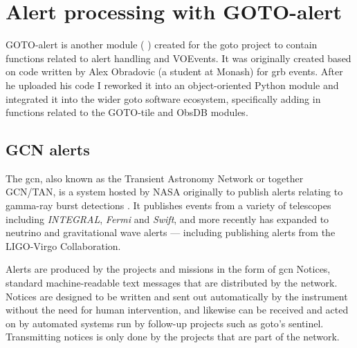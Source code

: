 \begin{colsection}
\begin{colsection}
\end{colsection}


\end{colsection}


\newpage
\section{Alert processing with GOTO-alert}
\label{sec:gotoalert}
\begin{colsection}


\begin{colsection}

GOTO-alert is another  module ( ) created for the \gls{goto} project to contain functions related to alert handling and VOEvents. It was originally created based on code written by Alex Obradovic (a student at Monash) for \gls{grb} events. After he uploaded his code I reworked it into an object-oriented Python module and integrated it into the wider \gls{goto} software ecosystem, specifically adding in functions related to the GOTO-tile and ObsDB modules.

\end{colsection}


\subsection{GCN alerts}
\label{sec:gcn}
\begin{colsection}

The \gls{gcn}, also known as the Transient Astronomy Network or together GCN/TAN, is a system hosted by NASA originally to publish alerts relating to gamma-ray burst detections \citep{GCN}. It publishes events from a variety of telescopes including \textit{INTEGRAL}, \textit{Fermi} and \textit{Swift}, and more recently has expanded to neutrino and gravitational wave alerts --- including publishing alerts from the LIGO-Virgo Collaboration.

Alerts are produced by the projects and missions in the form of \gls{gcn} Notices, standard machine-readable text messages that are distributed by the network. Notices are designed to be written and sent out automatically by the instrument without the need for human intervention, and likewise can be received and acted on by automated systems run by follow-up projects such as \gls{goto}'s sentinel. Transmitting notices is only done by the projects that are part of the network.


\end{colsection}
\end{colsection}
